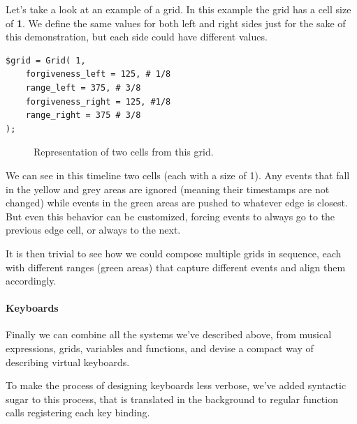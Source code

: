 \documentclass[a4paper,UKenglish,cleveref, autoref]{oasics-v2019}
\begin{document}
Let's take a look at an example of a grid. In this example the grid has a cell size of \textbf{1}. We define the same values for both left and right sides just for the sake of this demonstration, but each side could have different values.

\begin{lstlisting}[caption={Declaring a grid},label=list:8,captionpos=t,abovecaptionskip=-\medskipamount]
$grid = Grid( 1,
    forgiveness_left = 125, # 1/8
    range_left = 375, # 3/8
    forgiveness_right = 125, #1/8
    range_right = 375 # 3/8
);
\end{lstlisting}

\begin{figure}[ht]
  \centering
  {%
  \setlength{\fboxsep}{0pt}%
  \setlength{\fboxrule}{0pt}%
  }%
  \caption{Representation of two cells from this grid.}
  \label{fig:grid}
\end{figure}

We can see in this timeline two cells (each with a size of 1). Any events that fall in the yellow and grey areas are ignored (meaning their timestamps are not changed) while events in the green areas are pushed to whatever edge is closest. But even this behavior can be customized, forcing events to always go to the previous edge cell, or always to the next.

It is then trivial to see how we could compose multiple grids in sequence, each with different ranges (green areas) that capture different events and align them accordingly.

\paragraph*{Keyboards}
Finally we can combine all the systems we've described above, from musical expressions, grids, variables and functions, and devise a compact way of describing virtual keyboards.

To make the process of designing keyboards less verbose, we've added syntactic sugar to this process, that is translated in the background to regular function calls registering each key binding.
\end{document}
